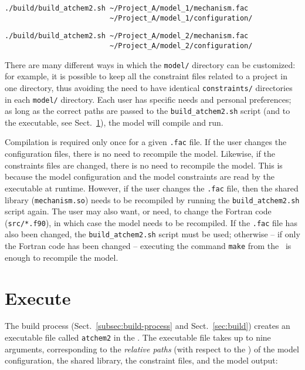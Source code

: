 \begin{verbatim}
./build/build_atchem2.sh ~/Project_A/model_1/mechanism.fac
                         ~/Project_A/model_1/configuration/
\end{verbatim}

\begin{verbatim}
./build/build_atchem2.sh ~/Project_A/model_2/mechanism.fac
                         ~/Project_A/model_2/configuration/
\end{verbatim}

There are many different ways in which the \texttt{model/} directory
can be customized: for example, it is possible to keep all the
constraint files related to a project in one directory, thus avoiding
the need to have identical \texttt{constraints/} directories in each
\texttt{model/} directory. Each user has specific needs and personal
preferences; as long as the correct paths are passed to the
\texttt{build\_atchem2.sh} script (and to the executable, see
Sect.~\ref{sec:execute}), the model will compile and run.

Compilation is required only once for a given \texttt{.fac} file. If
the user changes the configuration files, there is no need to
recompile the model. Likewise, if the constraints files are changed,
there is no need to recompile the model. This is because the model
configuration and the model constraints are read by the executable at
runtime. However, if the user changes the \texttt{.fac} file, then the
shared library (\texttt{mechanism.so}) needs to be recompiled by
running the \texttt{build\_atchem2.sh} script again. The user may also
want, or need, to change the Fortran code (\texttt{src/*.f90}), in
which case the model needs to be recompiled. If the \texttt{.fac} file
has also been changed, the \texttt{build\_atchem2.sh} script must be
used; otherwise -- if only the Fortran code has been changed --
executing the command \verb|make| from the \maindir\ is enough to
recompile the model.

\section{Execute} \label{sec:execute}

The build process (Sect.~\ref{subsec:build-process} and
Sect.~\ref{sec:build}) creates an executable file called
\texttt{atchem2} in the \maindir. The executable file takes up to nine
arguments, corresponding to the \emph{relative paths} (with respect to
the \maindir) of the model configuration, the shared library, the
constraint files, and the model output:

